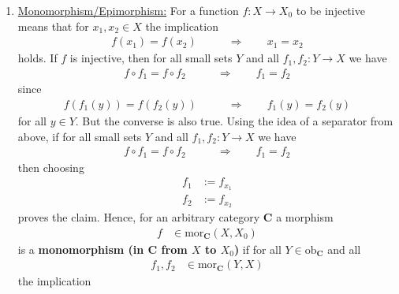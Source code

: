\begin{exa}
\begin{enumerate}
It is clear that the special feature of having a terminal object as a separator is a particularly nice one, since objects then behave a bit like sets and morphisms even more like functions - at least as long as the terminal object is not simultaneously the initial one.
Not surprisingly, this situation has its own name.
A category $\mathbf{C}$ with a terminal and an initial object is \textbf{well-pointed} if every terminal object is a separator and terminal objects are never isomorphic to initial ones.
\item[$\bullet$]
\underline{Monomorphism/Epimorphism:}
For a function $f \colon X \rightarrow X_{0}$ to be injective means that for $x_{1},x_{2} \in X$ the implication
\begin{align*}
  f(x_{1})
  =
  f(x_{2})
  \qquad
  &\Rightarrow
  \qquad
  x_{1}
  =
  x_{2}
\end{align*}
holds.
If $f$ is injective, then for all small sets $Y$ and all $f_{1},f_{2} \colon Y \rightarrow X$ we have
\begin{align*}
  f
  \circ
  f_{1}
  =
  f
  \circ
  f_{2}
  \qquad
  &\Rightarrow
  \qquad
  f_{1}
  =
  f_{2}
\end{align*}
since
\begin{align*}
  f
  \left(
    f_{1}(y)
  \right)
  =
  f
  \left(
    f_{2}(y)
  \right)
  \qquad
  &\Rightarrow
  \qquad
  f_{1}(y)
  =
  f_{2}(y)
\end{align*}
for all $y \in Y$.
But the converse is also true.
Using the idea of a separator from above, if for all small sets $Y$ and all $f_{1},f_{2} \colon Y \rightarrow X$ we have
\begin{align*}
  f
  \circ
  f_{1}
  =
  f
  \circ
  f_{2}
  \qquad
  &\Rightarrow
  \qquad
  f_{1}
  =
  f_{2}
\end{align*}
then choosing
\begin{align*}
  f_{1}
  &:=
  f_{x_{1}}
  \\
  f_{2}
  &:=
  f_{x_{2}}
\end{align*}
proves the claim.
Hence, for an arbitrary category $\mathbf{C}$ a morphism
\begin{align*}
  f
  &\in
  \mathrm{mor}_{\mathbf{C}}(X,X_{0})
\end{align*}
is a \textbf{monomorphism (in $\mathbf{C}$ from $X$ to $X_{0}$)} if for all $Y \in \mathrm{ob}_{\mathbf{C}}$ and all
\begin{align*}
  f_{1},
  f_{2}
  &\in
  \mathrm{mor}_{\mathbf{C}}(Y,X)
\end{align*}
the implication
\begin{align*}

\end{align*}
\end{enumerate}
\end{exa}
